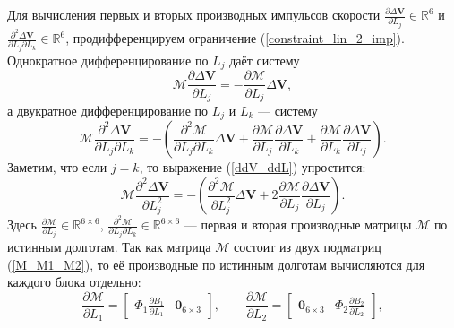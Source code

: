 Для вычисления первых и вторых производных импульсов скорости $\frac{\partial \Delta \mathbf{V}}{\partial L_j} \in \mathbb{R}^{6}$ и $\frac{\partial^2 \Delta \mathbf{V}}{\partial L_j \partial L_k} \in \mathbb{R}^{6}$, продифференцируем ограничение (\ref{constraint_lin_2_imp}). Однократное дифференцирование по $L_j$ даёт систему
\begin{equation}
    \mathcal{M} \frac{\partial \Delta \mathbf{V}}{\partial L_j} = - \frac{\partial \mathcal{M}}{\partial L_j} \Delta \mathbf{V},
\label{dV_dL}
\end{equation}
а двукратное дифференцирование по $L_j$ и $L_k$ --- систему
\begin{equation}
    \mathcal{M} \frac{\partial^2 \Delta \mathbf{V}}{\partial L_j \partial L_k} =
    - \left( \frac{\partial^2 \mathcal{M}}{\partial L_j \partial L_k} \Delta \mathbf{V} +
    \frac{\partial \mathcal{M}}{\partial L_j} \frac{\partial \Delta \mathbf{V}}{\partial L_k} +
    \frac{\partial \mathcal{M}}{\partial L_k} \frac{\partial \Delta \mathbf{V}}{\partial L_j} \right).
\label{ddV_ddL}
\end{equation}
Заметим, что если $j = k$, то выражение (\ref{ddV_ddL}) упростится:
\begin{equation*}
    \mathcal{M} \frac{\partial^2 \Delta \mathbf{V}}{\partial L_j^2} =
    - \left( \frac{\partial^2 \mathcal{M}}{\partial L_j^2} \Delta \mathbf{V} +
    2 \frac{\partial \mathcal{M}}{\partial L_j} \frac{\partial \Delta \mathbf{V}}{\partial L_j} \right).
\end{equation*}
Здесь $\frac{\partial \mathcal{M}}{\partial L_j} \in \mathbb{R}^{6 \times 6}$, $\frac{\partial^2 \mathcal{M}}{\partial L_j \partial L_k} \in \mathbb{R}^{6 \times 6}$
--- первая и вторая производные матрицы $\mathcal{M}$ по истинным долготам. Так как матрица $\mathcal{M}$ состоит из двух подматриц (\ref{M_M1_M2}), то её производные по истинным долготам вычисляются для каждого блока отдельно:
\begin{equation}
    \frac{\partial \mathcal{M}}{\partial L_1} = 
    \begin{bmatrix}
        \Phi_1 \frac{\partial B_1}{\partial L_1} & \mathbf{0}_{6 \times 3}
    \end{bmatrix},
    \quad \quad
    \frac{\partial \mathcal{M}}{\partial L_2} = 
    \begin{bmatrix}
        \mathbf{0}_{6 \times 3} & \Phi_2 \frac{\partial B_2}{\partial L_2}
    \end{bmatrix},
\label{dM_dL}
\end{equation}
